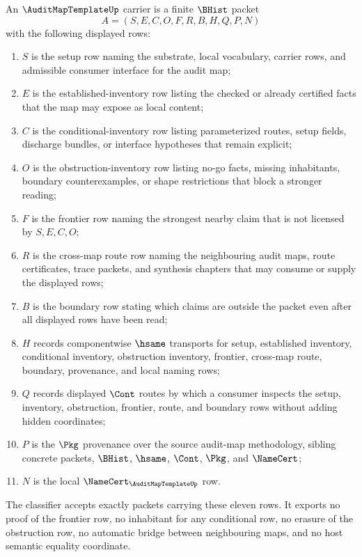 \begin{definition}
\label{def:audit-map-template-carrier}
An $\AuditMapTemplateUp$ carrier is a finite $\BHist$ packet
$$
A=(S,E,C,O,F,R,B,H,Q,P,N)
$$
with the following displayed rows:
\begin{enumerate}
\item $S$ is the setup row naming the substrate, local vocabulary, carrier rows, and admissible consumer interface for the audit map;
\item $E$ is the established-inventory row listing the checked or already certified facts that the map may expose as local content;
\item $C$ is the conditional-inventory row listing parameterized routes, setup fields, discharge bundles, or interface hypotheses that remain explicit;
\item $O$ is the obstruction-inventory row listing no-go facts, missing inhabitants, boundary counterexamples, or shape restrictions that block a stronger reading;
\item $F$ is the frontier row naming the strongest nearby claim that is not licensed by $S,E,C,O$;
\item $R$ is the cross-map route row naming the neighbouring audit maps, route certificates, trace packets, and synthesis chapters that may consume or supply the displayed rows;
\item $B$ is the boundary row stating which claims are outside the packet even after all displayed rows have been read;
\item $H$ records componentwise $\hsame$ transports for setup, established inventory, conditional inventory, obstruction inventory, frontier, cross-map route, boundary, provenance, and local naming rows;
\item $Q$ records displayed $\Cont$ routes by which a consumer inspects the setup, inventory, obstruction, frontier, route, and boundary rows without adding hidden coordinates;
\item $P$ is the $\Pkg$ provenance over the source audit-map methodology, sibling concrete packets, $\BHist$, $\hsame$, $\Cont$, $\Pkg$, and $\NameCert$;
\item $N$ is the local $\NameCert_{\AuditMapTemplateUp}$ row.
\end{enumerate}
The classifier accepts exactly packets carrying these eleven rows. It exports no proof of the frontier row, no inhabitant for any conditional row, no erasure of the obstruction row, no automatic bridge between neighbouring maps, and no host semantic equality coordinate.
\end{definition}

